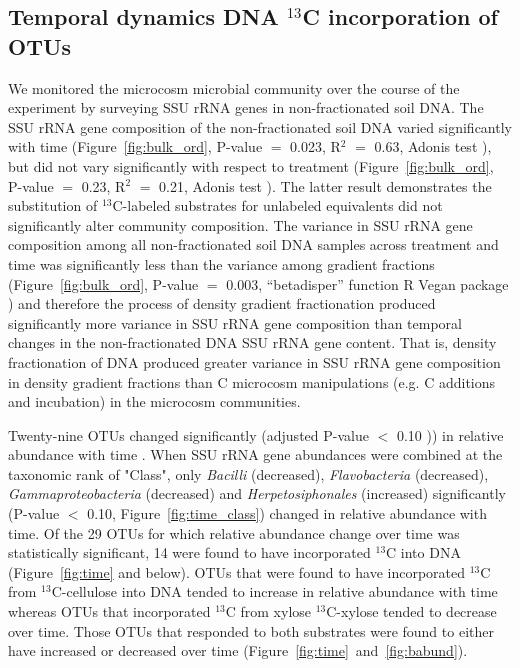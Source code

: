 \subsection{Temporal dynamics DNA $^{13}$C incorporation of OTUs}
We monitored the microcosm microbial community over the course of the
experiment by surveying SSU rRNA genes in non-fractionated soil DNA. The SSU
rRNA gene composition of the non-fractionated soil DNA varied significantly
with time (Figure~\ref{fig:bulk_ord}, P-value $=$ 0.023, R$^{2}$ $=$ 0.63,
Adonis test \citep{Anderson2001a}), but did not vary significantly with respect
to treatment (Figure~\ref{fig:bulk_ord}, P-value $=$ 0.23, R$^{2}$ $=$ 0.21,
Adonis test \citep{Anderson2001a}). The latter result demonstrates the
substitution of $^{13}$C-labeled substrates for unlabeled equivalents did not
significantly alter community composition. The variance in SSU rRNA gene
composition among all non-fractionated soil DNA samples across treatment and
time was significantly less than the variance among gradient fractions
(Figure~\ref{fig:bulk_ord}, P-value $=$ 0.003, “betadisper” function R Vegan
package \citep{oksanen2007vegan}) and therefore the process of density
gradient fractionation produced significantly more variance in SSU rRNA gene
composition than temporal changes in the non-fractionated DNA SSU rRNA gene
content. That is, density fractionation of DNA produced greater variance in SSU
rRNA gene composition in density gradient fractions than C microcosm
manipulations (e.g. C additions and incubation) in the microcosm communities.

Twenty-nine OTUs changed significantly (adjusted P-value $<$ 0.10
\citet{YBenjamini1995})) in relative abundance with time . When SSU rRNA gene
abundances were combined at the taxonomic rank of "Class", only
\textit{Bacilli} (decreased), \textit{Flavobacteria} (decreased),
\textit{Gammaproteobacteria} (decreased) and \textit{Herpetosiphonales}
(increased) significantly (P-value $<$ 0.10, Figure~\ref{fig:time_class})
changed in relative abundance with time. Of the 29 OTUs for which relative
abundance change over time was statistically significant, 14 were found to have
incorporated $^{13}$C into DNA (Figure~\ref{fig:time} and below). OTUs that
were found to have incorporated $^{13}$C from $^{13}$C-cellulose into DNA
tended to increase in relative abundance with time whereas OTUs that
incorporated $^{13}$C from xylose $^{13}$C-xylose tended to decrease over time.
Those OTUs that responded to both substrates were found to either have
increased or decreased over time (Figure~\ref{fig:time}~and~\ref{fig:babund}).

